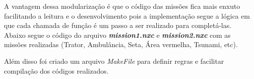 

A vantagem dessa modularização é que o código das missões fica mais enxuto facilitando a leitura e o desenvolvimento pois a implementação segue a lógica em que cada chamada de função é um passo a ser realizado para completá-las. Abaixo segue o código do arquivo \textbf{\textit{mission1.nxc}} e \textbf{\textit{mission2.nxc}} com as missões realizadas (Trator, Ambulância, Seta, Área vermelha, Tsunami, etc).





Além disso foi criado um arquivo \textit{MakeFile} para definir regras e facilitar compilação dos códigos realizados.



